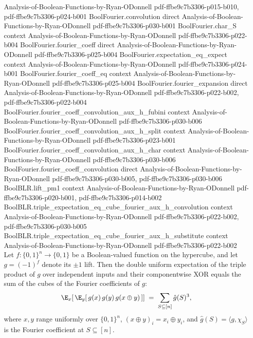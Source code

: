 \begin{lemma}
  {Analysis-of-Boolean-Functions-by-Ryan-ODonnell}
  {pdf-ffbe9c7b3306-p015-b010,
    pdf-ffbe9c7b3306-p024-b001}
\proofstep
  {BoolFourier.convolution}
  {direct}
  {Analysis-of-Boolean-Functions-by-Ryan-ODonnell}
  {pdf-ffbe9c7b3306-p030-b001}
\proofstep
  {BoolFourier.char_S}
  {context}
  {Analysis-of-Boolean-Functions-by-Ryan-ODonnell}
  {pdf-ffbe9c7b3306-p022-b004}
\proofstep
  {BoolFourier.fourier_coeff}
  {direct}
  {Analysis-of-Boolean-Functions-by-Ryan-ODonnell}
  {pdf-ffbe9c7b3306-p025-b004}
\proofstep
  {BoolFourier.expectation_eq_expect}
  {context}
  {Analysis-of-Boolean-Functions-by-Ryan-ODonnell}
  {pdf-ffbe9c7b3306-p024-b001}
\proofstep
  {BoolFourier.fourier_coeff_eq}
  {context}
  {Analysis-of-Boolean-Functions-by-Ryan-ODonnell}
  {pdf-ffbe9c7b3306-p025-b004}
\proofstep
  {BoolFourier.fourier_expansion}
  {direct}
  {Analysis-of-Boolean-Functions-by-Ryan-ODonnell}
  {pdf-ffbe9c7b3306-p022-b002,
    pdf-ffbe9c7b3306-p022-b004}
\proofstep
  {BoolFourier.fourier_coeff_convolution_aux_h_fubini}
  {context}
  {Analysis-of-Boolean-Functions-by-Ryan-ODonnell}
  {pdf-ffbe9c7b3306-p030-b006}
\proofstep
  {BoolFourier.fourier_coeff_convolution_aux_h_split}
  {context}
  {Analysis-of-Boolean-Functions-by-Ryan-ODonnell}
  {pdf-ffbe9c7b3306-p023-b001}
\proofstep
  {BoolFourier.fourier_coeff_convolution_aux_h_char}
  {context}
  {Analysis-of-Boolean-Functions-by-Ryan-ODonnell}
  {pdf-ffbe9c7b3306-p030-b006}
\proofstep
  {BoolFourier.fourier_coeff_convolution}
  {direct}
  {Analysis-of-Boolean-Functions-by-Ryan-ODonnell}
  {pdf-ffbe9c7b3306-p030-b005,
    pdf-ffbe9c7b3306-p030-b006}
\proofstep
  {BoolBLR.lift_pm1}
  {context}
  {Analysis-of-Boolean-Functions-by-Ryan-ODonnell}
  {pdf-ffbe9c7b3306-p020-b001,
    pdf-ffbe9c7b3306-p014-b002}
\proofstep
  {BoolBLR.triple_expectation_eq_cube_fourier_aux_h_convolution}
  {context}
  {Analysis-of-Boolean-Functions-by-Ryan-ODonnell}
  {pdf-ffbe9c7b3306-p022-b002,
    pdf-ffbe9c7b3306-p030-b005}
\proofstep
  {BoolBLR.triple_expectation_eq_cube_fourier_aux_h_substitute}
  {context}
  {Analysis-of-Boolean-Functions-by-Ryan-ODonnell}
  {pdf-ffbe9c7b3306-p022-b002}
Let $f : \{0,1\}^n \to \{0,1\}$ be a Boolean-valued function on the hypercube, and let
$g = (-1)^{f}$ denote its $\pm 1$ lift. Then the double uniform expectation of the
triple product of $g$ over independent inputs and their componentwise XOR equals the sum
of the cubes of the Fourier coefficients of $g$:
\[
  \E_{x}\!\left[\,\E_{y}\!\left[\,g(x)\,g(y)\,g(x \oplus y)\,\right]\right]
  \;=\;
  \sum_{S \subseteq [n]} \hat{g}(S)^{3},
\]
where $x, y$ range uniformly over $\{0,1\}^n$, $(x \oplus y)_i = x_i \oplus y_i$, and
$\hat{g}(S) = \langle g, \chi_S \rangle$ is the Fourier coefficient at $S \subseteq
[n]$.
\end{lemma}

